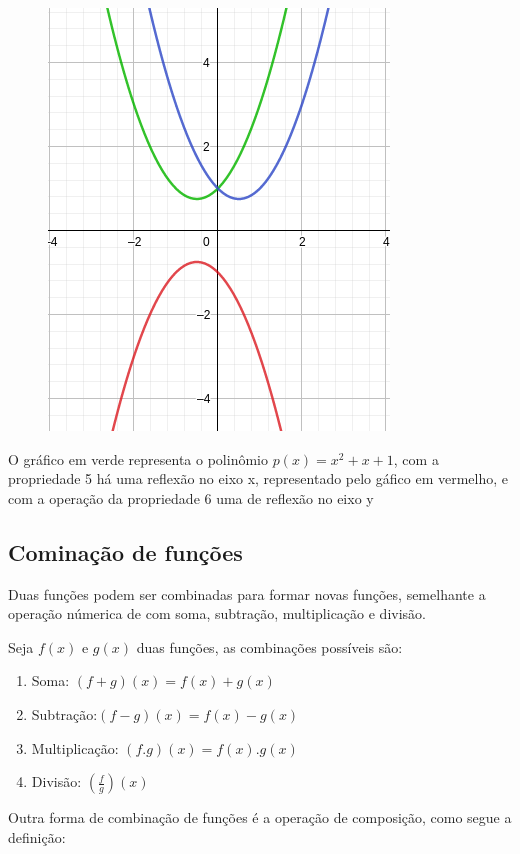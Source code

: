 \begin{multicols*}{2}
\begin{figure}[H]
                    \includegraphics[scale=0.35]{assets/rafael/img11.png}
            \end{figure}
            O gráfico em verde representa o polinômio $p(x) = x^2 + x +1$, com a propriedade 5 há uma 				reflexão no eixo x, representado pelo gáfico em vermelho, e com a operação da propriedade 6 uma 		de reflexão no eixo y
            
            
            \subsection*{Cominação de funções}		
            Duas funções podem ser combinadas para formar novas funções, semelhante a operação númerica de 			com soma, subtração, multiplicação e divisão.
            
            Seja $f(x)$ e $g(x)$ duas funções, as combinações possíveis são:
            \begin{enumerate}
            \item Soma: $(f+g)(x) = f(x) + g(x)$
            \item Subtração:$(f-g)(x) = f(x) - g(x)$
            \item Multiplicação: $(f.g)(x) = f(x).g(x)$
            \item Divisão: $\left( \frac{f}{g} \right)(x)$
            \end{enumerate}
            
            Outra forma de combinação de funções é a operação de composição, como segue a definição:
            

\end{multicols*}
